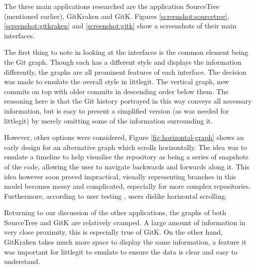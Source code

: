 The three main applications researched are the application SourceTree \cite{sourcetree} (mentioned earlier), GitKraken\cite{gitkraken} and GitK\cite{gitk}. Figures \ref{screenshot:sourcetree}, \ref{screenshot:gitkraken} and \ref{screenshot:gitk} show a screenshots of their main interfaces.




The first thing to note in looking at the interfaces is the common element being the Git graph. Though each has a different style and displays the information differently, the graphs are all prominent features of each interface. The decision was made to emulate the overall style in littlegit. The vertical graph, new commits on top with older commits in descending order below them. The reasoning here is that the Git history portrayed in this way conveys all necessary information, but is easy to present a simplified version (as was needed for littlegit) by merely omitting some of the information surrounding it.

However, other options were considered, Figure \ref{fig:horizontal-graph} shows an early design for an alternative graph which scrolls horizontally. The idea was to emulate a timeline to help visualise the repository as being a series of snapshots of the code, allowing the user to navigate backwards and forwards along it. This idea however soon proved impractical, visually representing branches in this model becomes messy and complicated, especially for more complex repositories. Furthermore, according to user testing \cite{horizontalScrolling}, users dislike horizontal scrolling.


Returning to our discussion of the other applications, the graphs of both SourceTree and GitK are relatively cramped. A large amount of information in very close proximity, this is especially true of GitK. On the other hand, GitKraken takes much more space to display the same information, a feature it was important for littlegit to emulate to ensure the data is clear and easy to understand.


